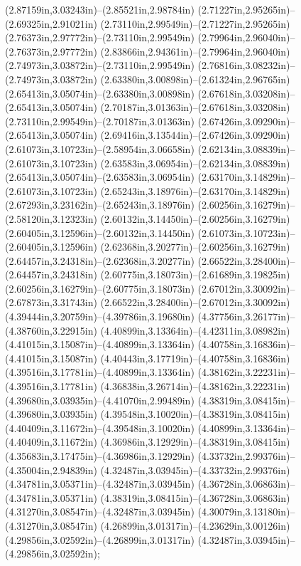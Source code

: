 (2.87159in,3.03243in)--(2.85521in,2.98784in) (2.71227in,2.95265in)--(2.69325in,2.91021in) (2.73110in,2.99549in)--(2.71227in,2.95265in) (2.76373in,2.97772in)--(2.73110in,2.99549in) (2.79964in,2.96040in)--(2.76373in,2.97772in) (2.83866in,2.94361in)--(2.79964in,2.96040in) (2.74973in,3.03872in)--(2.73110in,2.99549in) (2.76816in,3.08232in)--(2.74973in,3.03872in) (2.63380in,3.00898in)--(2.61324in,2.96765in) (2.65413in,3.05074in)--(2.63380in,3.00898in) (2.67618in,3.03208in)--(2.65413in,3.05074in) (2.70187in,3.01363in)--(2.67618in,3.03208in) (2.73110in,2.99549in)--(2.70187in,3.01363in) (2.67426in,3.09290in)--(2.65413in,3.05074in) (2.69416in,3.13544in)--(2.67426in,3.09290in) (2.61073in,3.10723in)--(2.58954in,3.06658in) (2.62134in,3.08839in)--(2.61073in,3.10723in) (2.63583in,3.06954in)--(2.62134in,3.08839in) (2.65413in,3.05074in)--(2.63583in,3.06954in) (2.63170in,3.14829in)--(2.61073in,3.10723in) (2.65243in,3.18976in)--(2.63170in,3.14829in) (2.67293in,3.23162in)--(2.65243in,3.18976in) (2.60256in,3.16279in)--(2.58120in,3.12323in) (2.60132in,3.14450in)--(2.60256in,3.16279in) (2.60405in,3.12596in)--(2.60132in,3.14450in) (2.61073in,3.10723in)--(2.60405in,3.12596in) (2.62368in,3.20277in)--(2.60256in,3.16279in) (2.64457in,3.24318in)--(2.62368in,3.20277in) (2.66522in,3.28400in)--(2.64457in,3.24318in) (2.60775in,3.18073in)--(2.61689in,3.19825in) (2.60256in,3.16279in)--(2.60775in,3.18073in) (2.67012in,3.30092in)--(2.67873in,3.31743in) (2.66522in,3.28400in)--(2.67012in,3.30092in) (4.39444in,3.20759in)--(4.39786in,3.19680in) (4.37756in,3.26177in)--(4.38760in,3.22915in) (4.40899in,3.13364in)--(4.42311in,3.08982in) (4.41015in,3.15087in)--(4.40899in,3.13364in) (4.40758in,3.16836in)--(4.41015in,3.15087in) (4.40443in,3.17719in)--(4.40758in,3.16836in) (4.39516in,3.17781in)--(4.40899in,3.13364in) (4.38162in,3.22231in)--(4.39516in,3.17781in) (4.36838in,3.26714in)--(4.38162in,3.22231in) (4.39680in,3.03935in)--(4.41070in,2.99489in) (4.38319in,3.08415in)--(4.39680in,3.03935in) (4.39548in,3.10020in)--(4.38319in,3.08415in) (4.40409in,3.11672in)--(4.39548in,3.10020in) (4.40899in,3.13364in)--(4.40409in,3.11672in) (4.36986in,3.12929in)--(4.38319in,3.08415in) (4.35683in,3.17475in)--(4.36986in,3.12929in) (4.33732in,2.99376in)--(4.35004in,2.94839in) (4.32487in,3.03945in)--(4.33732in,2.99376in) (4.34781in,3.05371in)--(4.32487in,3.03945in) (4.36728in,3.06863in)--(4.34781in,3.05371in) (4.38319in,3.08415in)--(4.36728in,3.06863in) (4.31270in,3.08547in)--(4.32487in,3.03945in) (4.30079in,3.13180in)--(4.31270in,3.08547in) (4.26899in,3.01317in)--(4.23629in,3.00126in) (4.29856in,3.02592in)--(4.26899in,3.01317in) (4.32487in,3.03945in)--(4.29856in,3.02592in);
